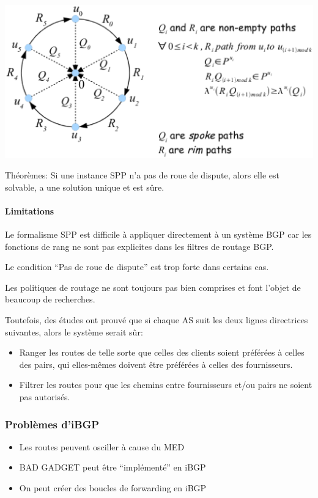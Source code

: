\documentclass{report}
\begin{document}
\includegraphics[width=\textwidth]{disputewheel.eps}

Théorèmes: Si une instance SPP n'a pas de roue de dispute, alors elle
est solvable, a une solution unique et est sûre.

\paragraph{Limitations}

Le formalisme SPP est difficile à appliquer directement à un système
BGP car les fonctions de rang ne sont pas explicites dans les filtres
de routage BGP.

Le condition ``Pas de roue de dispute'' est trop forte dans certains
cas.

Les politiques de routage ne sont toujours pas bien comprises et font
l'objet de beaucoup de recherches.

Toutefois, des études ont prouvé que si chaque AS suit les deux lignes
directrices suivantes, alors le système serait sûr:

\begin{itemize}
\item Ranger les routes de telle sorte que celles des clients soient
  préférées à celles des pairs, qui elles-mêmes doivent être préférées
  à celles des fournisseurs.
\item Filtrer les routes pour que les chemins entre fournisseurs et/ou
  pairs ne soient pas autorisés.
\end{itemize}

\subsubsection{Problèmes d'iBGP}

\begin{itemize}
\item Les routes peuvent osciller à cause du MED
\item BAD GADGET peut être ``implémenté'' en iBGP
\item On peut créer des boucles de forwarding en iBGP
\end{itemize}
\end{document}
